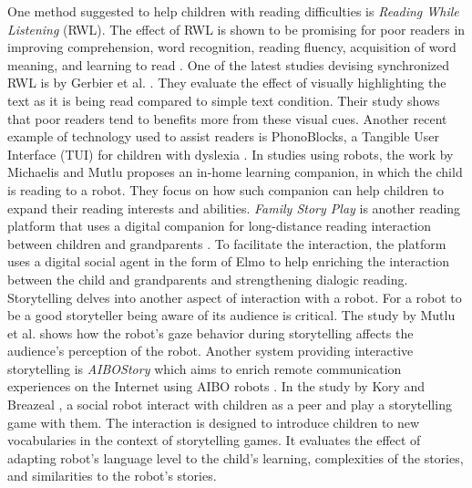 \documentclass{sigchi}
\begin{document}
One method suggested to help children with reading difficulties is \textit{Reading While Listening} (RWL). 
The effect of RWL is shown to be promising for poor readers in improving comprehension, word recognition, reading fluency, acquisition of word meaning, and learning to read \cite{carbo1978teaching,chomsky1976after}. 
One of the latest studies devising synchronized RWL is by Gerbier et al. \cite{gerbier2018audio}. 
They evaluate the effect of visually highlighting the text as it is being read compared to simple text condition.
Their study shows that poor readers tend to benefits more from these visual cues.
Another recent example of technology used to assist readers is PhonoBlocks, a Tangible User Interface (TUI) for children with dyslexia \cite{fan2016design}.
In studies using robots, the work by Michaelis and Mutlu \cite{michaelis2017someone} proposes an in-home learning companion, in which the child is reading to a robot. 
They focus on how such companion can help children to expand their reading interests and abilities. 
\textit{Family Story Play} is another reading platform that uses a digital companion for long-distance reading interaction between children and grandparents \cite{raffle2010family}.  
To facilitate the interaction, the platform uses a digital social agent in the form of Elmo to help enriching the interaction between the child and grandparents and strengthening dialogic reading. 
Storytelling delves into another aspect of interaction with a robot. 
For a robot to be a good storyteller being aware of its audience is critical.
The study by Mutlu et al. \cite{mutlu2006storytelling} shows how the robot's gaze behavior during storytelling affects the audience's perception of the robot.
Another system providing interactive storytelling is \textit{AIBOStory} which aims to enrich remote communication experiences on the Internet using AIBO robots \cite{papadopoulos2013aibostory}.
In the study by Kory and Breazeal \cite{kory2014storytelling}, a social robot interact with children as a peer and play a storytelling game with them.
The interaction is designed to introduce children to new vocabularies in the context of storytelling games. 
It evaluates the effect of adapting robot's language level to the child's learning, complexities of the stories, and similarities to the robot's stories.

\setlength{\parskip}{2em}
\end{document}
